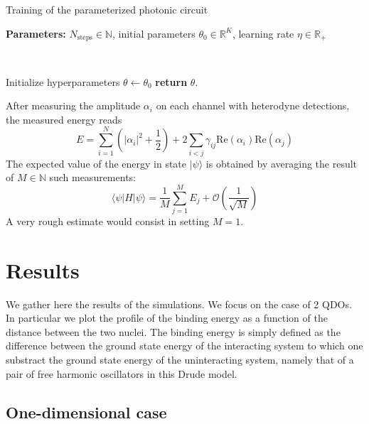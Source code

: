 \documentclass[reprint, amsmath, amssymb, aps]{revtex4-2}
\begin{document}
    \begin{algorithm}
        \caption{Training of the parameterized photonic circuit}\label{alg:training}
        \textbf{Parameters:} $N_\text{steps}\in\mathbb N$, initial parameters $\theta_0\in\mathbb R^K$, learning rate $\eta\in\mathbb R_+$

        \

        Initialize hyperparameters $\theta \gets \theta_0$\;
        \textbf{return} $\theta$.
    \end{algorithm}

    After measuring the amplitude $\alpha_i$ on each channel with heterodyne detections, the measured energy reads
    \begin{equation}
    \label{eq:energy_coherent}
        E = \sum_{i=1}^N\left(|\alpha_i|^2+\frac{1}{2}\right) + 2\sum_{i<j}\gamma_{ij}\text{Re}(\alpha_i)\text{Re}(\alpha_j)
    \end{equation}
    The expected value of the energy in state $|\psi\rangle$ is obtained by averaging the result of $M\in\mathbb N$ such measurements:
    \begin{equation}
        \langle\psi|H|\psi\rangle = \frac{1}{M}\sum_{j=1}^M E_j + \mathcal O\left(\frac{1}{\sqrt M}\right)
    \end{equation}
    A very rough estimate would consist in setting $M=1$.

\section{Results}
    We gather here the results of the simulations. We focus on the case of 2 QDOs. In particular we plot the profile of the binding energy as a function of the distance between the two nuclei. The binding energy is simply defined as the difference between the ground state energy of the interacting system to which one substract the ground state energy of the uninteracting system, namely that of a pair of free harmonic oscillators in this Drude model.

    \subsection{One-dimensional case}
\end{document}

